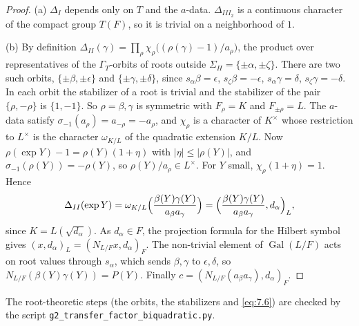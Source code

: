 \documentclass[12pt,letterpaper]{amsart}
\theoremstyle{plain}
\theoremstyle{definition}
\theoremstyle{remark}
\theoremstyle{definition}
\DeclareMathOperator{\Gal}{Gal}
\begin{document}
\begin{proof}
(a) $\Delta_I$ depends only on $T$ and the $a$-data. $\Delta_{III_2}$ is a
continuous character of the compact group $T(F)$, so it is trivial on a
neighborhood of $1$.

(b) By definition $\Delta_{II}(\gamma)=\prod_\rho\chi_\rho\bigl((\rho(\gamma)-1)/a_\rho\bigr)$,
the product over representatives of the $\Gamma_T$-orbits of roots outside
$\Sigma_H=\{\pm\alpha,\pm\zeta\}$. There are two such orbits,
$\{\pm\beta,\pm\epsilon\}$ and $\{\pm\gamma,\pm\delta\}$, since
$s_\alpha\beta=\epsilon$, $s_\zeta\beta=-\epsilon$, $s_\alpha\gamma=\delta$,
$s_\zeta\gamma=-\delta$. In each orbit the stabilizer of a root is trivial and
the stabilizer of the pair $\{\rho,-\rho\}$ is $\{1,-1\}$. So $\rho=\beta,\gamma$
is symmetric with $F_\rho=K$ and $F_{\pm\rho}=L$. The $a$-data satisfy
$\sigma_{-1}(a_\rho)=a_{-\rho}=-a_\rho$, and $\chi_\rho$ is a character of
$K^\times$ whose restriction to $L^\times$ is the character $\omega_{K/L}$
of the quadratic extension $K/L$. Now
$\rho(\exp Y)-1=\rho(Y)(1+\eta)$ with $|\eta|\le|\rho(Y)|$, and
$\sigma_{-1}(\rho(Y))=-\rho(Y)$, so $\rho(Y)/a_\rho\in L^\times$. For $Y$ small,
$\chi_\rho(1+\eta)=1$. Hence
\[
\Delta_{II}(\exp Y)=\omega_{K/L}\Bigl(\frac{\beta(Y)\gamma(Y)}{a_\beta a_\gamma}\Bigr)
=\Bigl(\frac{\beta(Y)\gamma(Y)}{a_\beta a_\gamma},d_\alpha\Bigr)_L ,
\]
since $K=L(\sqrt{d_\alpha})$. As $d_\alpha\in F$, the projection formula for
the Hilbert symbol \cite[Ch.~XIV]{Ser79} gives $(x,d_\alpha)_L=(N_{L/F}x,d_\alpha)_F$.
The non-trivial element of $\Gal(L/F)$ acts on root values through $s_\alpha$,
which sends $\beta,\gamma$ to $\epsilon,\delta$, so
$N_{L/F}(\beta(Y)\gamma(Y))=P(Y)$. Finally
$c=(N_{L/F}(a_\beta a_\gamma),d_\alpha)_F$.
\end{proof}

The root-theoretic steps (the orbits, the stabilizers and \eqref{eq:7.6}) are
checked by the script \texttt{g2\_transfer\_factor\_biquadratic.py}.
\end{document}
